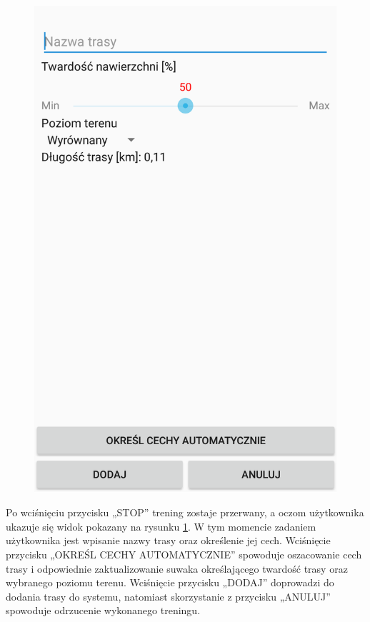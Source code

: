 \begin{figure}[H]
\begin{minipage}{.5\textwidth}
  \includegraphics[width=.8\linewidth,frame]{img/cechy}
  \label{image:cechy-screen}
\end{minipage}
\end{figure}
Po wciśnięciu przycisku „STOP” trening zostaje przerwany, a oczom użytkownika ukazuje się widok pokazany na rysunku \ref{image:cechy-screen}. W tym momencie zadaniem użytkownika jest wpisanie nazwy trasy oraz określenie jej cech. Wciśnięcie przycisku „OKREŚL CECHY AUTOMATYCZNIE” spowoduje oszacowanie cech trasy i odpowiednie zaktualizowanie suwaka określającego twardość trasy oraz wybranego poziomu terenu. Wciśnięcie przycisku „DODAJ” doprowadzi do dodania trasy do systemu, natomiast skorzystanie z przycisku „ANULUJ” spowoduje odrzucenie wykonanego treningu.

